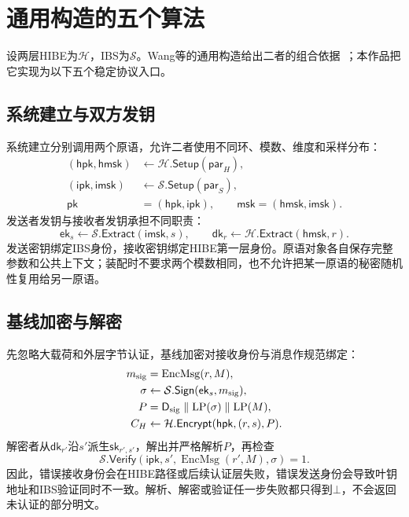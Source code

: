\documentclass[UTF8,a4paper,12pt,oneside,openany,fontset=fandol]{ctexrep}
\begin{document}
\section{通用构造的五个算法}
设两层HIBE为\(\mathcal H\)，IBS为\(\mathcal S\)。Wang等的通用构造给出二者的组合依据~\cite{wang2024ibme}；本作品把它实现为以下五个稳定协议入口。

\subsection{系统建立与双方发钥}
系统建立分别调用两个原语，允许二者使用不同环、模数、维度和采样分布：
\begin{align*}
 (\mathsf{hpk},\mathsf{hmsk})&\leftarrow\mathcal H.\mathsf{Setup}(\mathsf{par}_{H}),\\
 (\mathsf{ipk},\mathsf{imsk})&\leftarrow\mathcal S.\mathsf{Setup}(\mathsf{par}_{S}),\\
 \mathsf{pk}&=(\mathsf{hpk},\mathsf{ipk}),\qquad
 \mathsf{msk}=(\mathsf{hmsk},\mathsf{imsk}).
\end{align*}
发送者发钥与接收者发钥承担不同职责：
\[
 \mathsf{ek}_s\leftarrow\mathcal S.\mathsf{Extract}(\mathsf{imsk},s),\qquad
 \mathsf{dk}_r\leftarrow\mathcal H.\mathsf{Extract}(\mathsf{hmsk},r).
\]
发送密钥绑定IBS身份，接收密钥绑定HIBE第一层身份。原语对象各自保存完整参数和公共上下文；装配时不要求两个模数相同，也不允许把某一原语的秘密随机性复用给另一原语。

\subsection{基线加密与解密}
先忽略大载荷和外层字节认证，基线加密对接收身份与消息作规范绑定：
\begin{align*}
 m_{\rm sig}&=\operatorname{EncMsg}(r,M),\\
 \sigma&\leftarrow\mathcal S.\mathsf{Sign}(\mathsf{ek}_s,m_{\rm sig}),\\
 P&=\mathsf D_{\rm sig}\parallel\mathrm{LP}(\sigma)\parallel\mathrm{LP}(M),\\
 C_H&\leftarrow\mathcal H.\mathsf{Encrypt}(\mathsf{hpk},(r,s),P).
\end{align*}
解密者从\(\mathsf{dk}_{r'}\)沿\(s'\)派生\(\mathsf{sk}_{r',s'}\)，解出并严格解析\(P\)，再检查
\[
 \mathcal S.\mathsf{Verify}
   (\mathsf{ipk},s',\operatorname{EncMsg}(r',M),\sigma)=1.
\]
因此，错误接收身份会在HIBE路径或后续认证层失败，错误发送身份会导致叶钥地址和IBS验证同时不一致。解析、解密或验证任一步失败都只得到\(\bot\)，不会返回未认证的部分明文。
\end{document}
